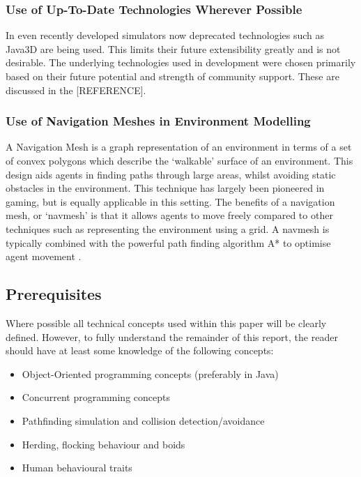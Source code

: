 \subsubsection{Use of Up-To-Date Technologies Wherever Possible}
In even recently developed simulators now deprecated technologies such as Java3D are being used. This limits their future extensibility greatly and is not desirable.
The underlying technologies used in development were chosen primarily based on their future potential and strength of community support.
These are discussed in the [REFERENCE].

\subsubsection{Use of Navigation Meshes in Environment Modelling}
A Navigation Mesh is a graph representation of an environment in terms of a set of convex polygons which describe the `walkable' surface of an environment. This design aids agents in finding paths through large areas, whilst avoiding static obstacles in the environment.
This technique has largely been pioneered in gaming, but is equally applicable in this setting. The benefits of a navigation mesh, or `navmesh' is that it allows agents to move 
freely compared to other techniques such as representing the environment using a grid. A navmesh is typically combined with the powerful path finding algorithm A* to 
optimise agent movement \cite{A*Review}.

\subsection{Prerequisites}
Where possible all technical concepts used within this paper will be clearly defined. However, to fully understand the remainder of this report, the reader should have at least
some knowledge of the following concepts:
\begin{itemize}
 \item Object-Oriented programming concepts (preferably in Java)
 \item Concurrent programming concepts
 \item Pathfinding simulation and collision detection/avoidance~\cite{gameProgramming}~\cite{collisionDetection}
 \item Herding, flocking behaviour and boids~\cite{HAndBoid}~\cite{Fbehavior}
 \item Human behavioural traits~\cite{HumanBehaviouralTraits}
\end{itemize}


